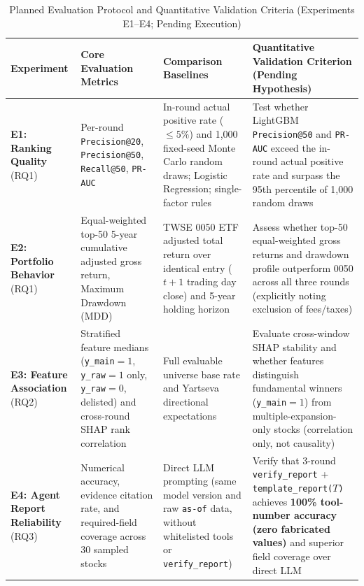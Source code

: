 \documentclass[conference]{IEEEtran}
\begin{document}
\begin{table}[t]
\centering
\caption{Planned Evaluation Protocol and Quantitative Validation Criteria (Experiments E1--E4; Pending Execution)}
\label{tab:experiments}
\renewcommand{\arraystretch}{1.14}
\scriptsize
\begin{tabularx}{\textwidth}{L{2.25cm} L{3.35cm} L{3.45cm} Y}
\toprule
\textbf{Experiment} & \textbf{Core Evaluation Metrics} & \textbf{Comparison Baselines} & \textbf{Quantitative Validation Criterion (Pending Hypothesis)} \\
\midrule
\textbf{E1: Ranking Quality} (RQ1) &
Per-round \texttt{Precision@20}, \texttt{Precision@50}, \texttt{Recall@50}, \texttt{PR-AUC} &
In-round actual positive rate ($\le 5\%$) and 1,000 fixed-seed Monte Carlo random draws; Logistic Regression; single-factor rules &
Test whether LightGBM \texttt{Precision@50} and \texttt{PR-AUC} exceed the in-round actual positive rate and surpass the 95th percentile of 1,000 random draws \\
\midrule
\textbf{E2: Portfolio Behavior} (RQ1) &
Equal-weighted top-50 5-year cumulative adjusted gross return, Maximum Drawdown (MDD) &
TWSE 0050 ETF adjusted total return over identical entry ($t + 1$ trading day close) and 5-year holding horizon &
Assess whether top-50 equal-weighted gross returns and drawdown profile outperform 0050 across all three rounds (explicitly noting exclusion of fees/taxes) \\
\midrule
\textbf{E3: Feature Association} (RQ2) &
Stratified feature medians (\texttt{y\_main}$=1$, \texttt{y\_raw}$=1$ only, \texttt{y\_raw}$=0$, delisted) and cross-round SHAP rank correlation &
Full evaluable universe base rate and Yartseva \cite{yartseva2025} directional expectations &
Evaluate cross-window SHAP stability and whether features distinguish fundamental winners (\texttt{y\_main}$=1$) from multiple-expansion-only stocks (correlation only, not causality) \\
\midrule
\textbf{E4: Agent Report Reliability} (RQ3) &
Numerical accuracy, evidence citation rate, and required-field coverage across 30 sampled stocks &
Direct LLM prompting (same model version and raw \texttt{as-of} data, without whitelisted tools or \texttt{verify\_report}) &
Verify that 3-round \texttt{verify\_report} + \texttt{template\_report($T$)} achieves \textbf{100\% tool-number accuracy (zero fabricated values)} and superior field coverage over direct LLM \\
\bottomrule
\end{tabularx}
\end{table}
\end{document}
